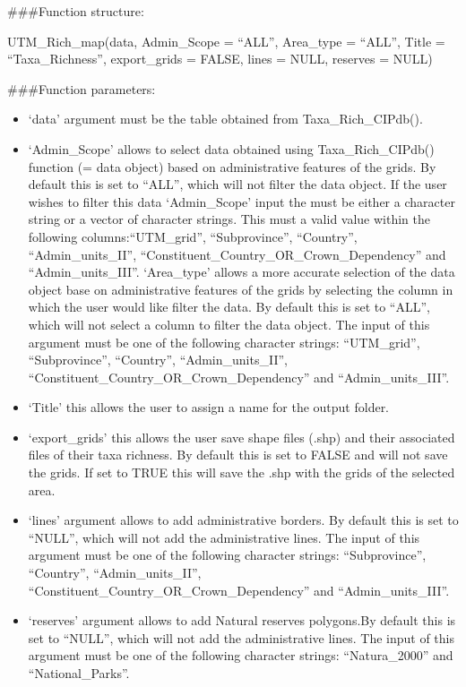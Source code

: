 \documentclass[
]{article}
\providecommand{\tightlist}{%
  \setlength{\itemsep}{0pt}\setlength{\parskip}{0pt}}
\begin{document}
\#\#\#Function structure:

UTM\_Rich\_map(data, Admin\_Scope = ``ALL'', Area\_type = ``ALL'', Title
= ``Taxa\_Richness'', export\_grids = FALSE, lines = NULL, reserves =
NULL)

\#\#\#Function parameters:

\begin{itemize}
\tightlist
\item
  `data' argument must be the table obtained from Taxa\_Rich\_CIPdb().
\item
  `Admin\_Scope' allows to select data obtained using
  Taxa\_Rich\_CIPdb() function (= data object) based on administrative
  features of the grids. By default this is set to ``ALL'', which will
  not filter the data object. If the user wishes to filter this data
  `Admin\_Scope' input the must be either a character string or a vector
  of character strings. This must a valid value within the following
  columns:``UTM\_grid'', ``Subprovince'', ``Country'',
  ``Admin\_units\_II'', ``Constituent\_Country\_OR\_Crown\_Dependency''
  and ``Admin\_units\_III''. `Area\_type' allows a more accurate
  selection of the data object base on administrative features of the
  grids by selecting the column in which the user would like filter the
  data. By default this is set to ``ALL'', which will not select a
  column to filter the data object. The input of this argument must be
  one of the following character strings: ``UTM\_grid'',
  ``Subprovince'', ``Country'', ``Admin\_units\_II'',
  ``Constituent\_Country\_OR\_Crown\_Dependency'' and
  ``Admin\_units\_III''.
\item
  `Title' this allows the user to assign a name for the output folder.
\item
  `export\_grids' this allows the user save shape files (.shp) and their
  associated files of their taxa richness. By default this is set to
  FALSE and will not save the grids. If set to TRUE this will save the
  .shp with the grids of the selected area.
\item
  `lines' argument allows to add administrative borders. By default this
  is set to ``NULL'', which will not add the administrative lines. The
  input of this argument must be one of the following character strings:
  ``Subprovince'', ``Country'', ``Admin\_units\_II'',
  ``Constituent\_Country\_OR\_Crown\_Dependency'' and
  ``Admin\_units\_III''.
\item
  `reserves' argument allows to add Natural reserves polygons.By default
  this is set to ``NULL'', which will not add the administrative lines.
  The input of this argument must be one of the following character
  strings: ``Natura\_2000'' and ``National\_Parks''.
\end{itemize}
\end{document}
